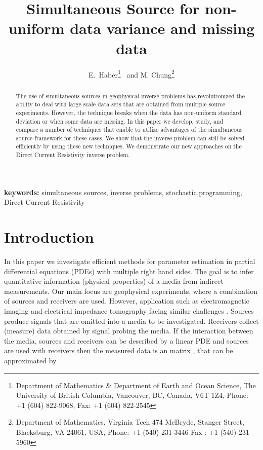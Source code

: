 \documentclass[12pt]{article}
\begin{document}
\title{Simultaneous Source for non-uniform data variance and missing data}

\author{{E.\ Haber\thanks{Department of Mathematics
\& Department of Earth and Ocean Science, The University of British Columbia, Vancouver, BC, Canada, V6T-1Z4,  Phone: +1 (604) 822-9068, Fax: +1 (604) 822-2545}}  \ and {M. Chung\thanks{
Department of Mathematics, Virginia Tech
474 McBryde, Stanger Street, Blacksburg, VA 24061, USA,
Phone: +1 (540) 231-3446     Fax : +1 (540) 231-5960 }}}

\maketitle

\begin{abstract}
The use of simultaneous sources in geophysical inverse problems has revolutionized the ability to deal with large scale data sets that are obtained from multiple source experiments. However, the technique breaks when the data has non-uniform standard deviation or when some data are missing. In this paper we develop, study, and compare a number of techniques that enable to utilize advantages of the simultaneous source framework for these cases. We show that the inverse problem can still be solved efficiently by using these new techniques. We demonstrate our new approaches on the Direct Current Resistivity inverse problem.
\end{abstract}

{\bf keywords:} simultaneous sources, inverse problems, stochastic programming, Direct Current Resistivity\\

\section{Introduction}

In this paper we investigate efficient methods for parameter estimation in partial differential equations (PDEs) with multiple right hand sides. The goal is to infer quantitative information (physical properties) of a media from indirect measurements. Our main focus are geophysical experiments, where a combination of sources and receivers are used. However, application such as electromagnetic imaging and electrical impedance tomography facing similar challenges \cite{smvoz,brocea,devony,na1,jc1}. Sources produce signals that are omitted into a media to be investigated. Receivers collect (measure) data obtained by signal probing the media. If the interaction between the media, sources and receivers can be described by a linear PDE and  sources are used with  receivers then the measured data is an  matrix , that can be approximated by
\end{document}
